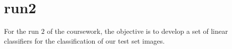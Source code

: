\section{run2}

For the run $2$ of the coursework, the objective is to develop a set of linear classifiers for the classification of our test set images. 